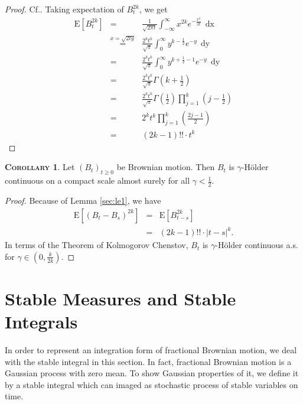 \documentclass[a4paper, twoside, 11pt]{article}
\theoremstyle{definition}
\newtheorem{corollary}[definition]{\scshape Corollary}
\begin{document}
\begin{proof}
  Cf.\cite{shilling}. Taking expectation of $B_t^{2k}$, we get
  \begin{eqnarray*}
	\mathrm{E}[B_t^{2k}] &=& \frac{1}{\sqrt{2\pi t}}\int_{-\infty}^{\infty} x^{2k} e^{-\frac{x^2}{2t}}\,\mathop{dx}\\
	&\overset{x=\sqrt{2ty}}{=}& \frac{2^kt^k}{\sqrt{\pi}} \int_0^{\infty} y^{k-\frac{1}{2}} e^{-y}\,\mathop{dy}\\
	&=& \frac{2^kt^k}{\sqrt{\pi}} \int_0^{\infty} y^{k+\frac{1}{2}-1} e^{-y}\,\mathop{dy}\\
	&=& \frac{2^kt^k}{\sqrt{\pi}} \Gamma(k + \frac{1}{2})\\
	&=& \frac{2^kt^k}{\sqrt{\pi}} \Gamma(\frac{1}{2})\prod_{j=1}^k(j-\frac{1}{2}) \\
	&=& 2^k t^k\prod_{j=1}^k(\frac{2j-1}{2}) \\
	&=& (2k - 1)!!\cdot t^k
  \end{eqnarray*}
\end{proof}

\begin{corollary}
  Let $(B_t)_{t\ge 0}$ be Brownian motion. Then $B_t$ is $\gamma$-H\"older continuous on a compact scale almost surely for all $\gamma < \frac{1}{2}$.
\end{corollary}

\begin{proof}
  Because of Lemma \ref{sec:le1}, we have
  \begin{eqnarray*}
	\mathrm{E}[(B_t-B_s)^{2k}] &=& \mathrm{E}[B_{t-s}^{2k}]\\
	&=& (2k - 1)!! \cdot |t-s|^{k}.
  \end{eqnarray*}
  In terms of the Theorem of Kolmogorov Chenstov, $B_t$ is $\gamma$-H\"older continuous a.s. for $\gamma \in (0, \frac{k}{2k})$.
\end{proof}

\newpage

\section{Stable Measures and Stable Integrals}
\setcounter{equation}{0}
In order to represent an integration form of fractional Brownian motion, we deal with the stable integral in this section. In fact, fractional Brownian motion is a Gaussian process with zero mean. To show Gaussian properties of it, we define it by a 
stable integral which can imaged as stochastic process of stable variables on time.
\end{document}
